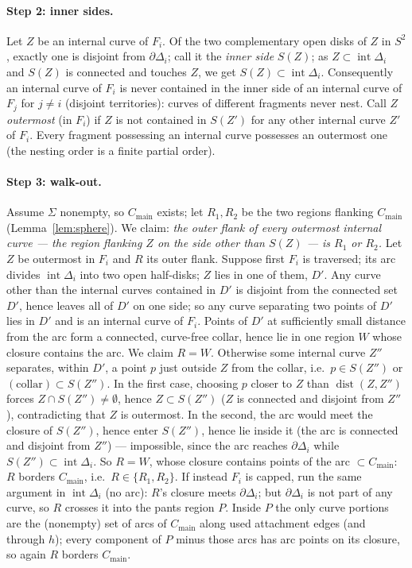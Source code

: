 \documentclass[11pt]{article}
\theoremstyle{remark}
\newcommand{\Cmain}{C_{\mathrm{main}}}
\newcommand{\inn}[1]{S(#1)}
\begin{document}
\paragraph{Step 2: inner sides.}
Let $Z$ be an internal curve of $F_i$. Of the two complementary open
disks of $Z$ in $S^2$, exactly one is disjoint from $\partial\Delta_i$;
call it the \emph{inner side} $\inn{Z}$; as $Z\subset\operatorname{int}
\Delta_i$ and $\inn{Z}$ is connected and touches $Z$, we get
$\inn{Z}\subset\operatorname{int}\Delta_i$. Consequently an internal
curve of $F_i$ is never contained in the inner side of an internal curve
of $F_j$ for $j\ne i$ (disjoint territories): curves of different
fragments never nest. Call $Z$ \emph{outermost} (in $F_i$) if $Z$ is not
contained in $\inn{Z'}$ for any other internal curve $Z'$ of $F_i$.
Every fragment possessing an internal curve possesses an outermost one
(the nesting order is a finite partial order).

\paragraph{Step 3: walk-out.}
Assume $\Sigma$ nonempty, so $\Cmain$ exists; let $R_1,R_2$ be the two
regions flanking $\Cmain$ (Lemma~\ref{lem:sphere}). We claim: \emph{the
outer flank of every outermost internal curve --- the region flanking
$Z$ on the side other than $\inn{Z}$ --- is $R_1$ or $R_2$.} Let $Z$ be
outermost in $F_i$ and $R$ its outer flank. Suppose first $F_i$ is
traversed; its arc divides $\operatorname{int}\Delta_i$ into two open
half-disks; $Z$ lies in one of them, $D'$. Any curve other than the
internal curves contained in $D'$ is disjoint from the connected set
$D'$, hence leaves all of $D'$ on one side; so any curve separating two
points of $D'$ lies in $D'$ and is an internal curve of $F_i$. Points of
$D'$ at sufficiently small distance from the arc form a connected,
curve-free collar, hence lie in one region $W$ whose closure contains
the arc. We claim $R=W$. Otherwise some internal curve $Z''$ separates,
within $D'$, a point $p$ just outside $Z$ from the collar, i.e.\
$p\in\inn{Z''}$ or $(\text{collar})\subset\inn{Z''}$. In the first case,
choosing $p$ closer to $Z$ than $\operatorname{dist}(Z,Z'')$ forces
$Z\cap\inn{Z''}\ne\emptyset$, hence $Z\subset\inn{Z''}$ ($Z$ is
connected and disjoint from $Z''$), contradicting that $Z$ is outermost.
In the second, the arc would meet the closure of $\inn{Z''}$, hence
enter $\inn{Z''}$, hence lie inside it (the arc is connected and
disjoint from $Z''$) --- impossible, since the arc reaches
$\partial\Delta_i$ while $\inn{Z''}\subset\operatorname{int}\Delta_i$.
So $R=W$, whose closure contains points of the arc $\subset\Cmain$: $R$
borders $\Cmain$, i.e.\ $R\in\{R_1,R_2\}$. If instead $F_i$ is capped,
run the same argument in $\operatorname{int}\Delta_i$ (no arc): $R$'s
closure meets $\partial\Delta_i$; but $\partial\Delta_i$ is not part of
any curve, so $R$ crosses it into the pants region $P$. Inside $P$ the
only curve portions are the (nonempty) set of arcs of $\Cmain$ along
used attachment edges (and through $h$); every component of $P$ minus
those arcs has arc points on its closure, so again $R$ borders $\Cmain$.
\end{document}
